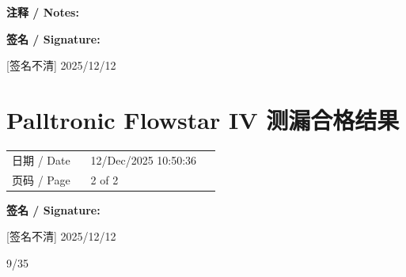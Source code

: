 \documentclass[UTF8,10pt,a4paper,fontset=fandol]{ctexart}
\newcommand{\fieldvalue}[1]{#1}
\newcommand{\handwritten}[1]{#1}
\begin{document}
\noindent\textbf{注释 / Notes:}

\vspace{1.5em}

\noindent\textbf{签名 / Signature:}

\fieldvalue{\handwritten{[签名不清]}} \hfill
\fieldvalue{\handwritten{2025/12/12}}

\vfill

\section{Palltronic Flowstar IV 测漏合格结果}

\begin{tabular}{@{}p{0.34\linewidth}p{0.56\linewidth}@{}}
日期 / Date &
\fieldvalue{12/Dec/2025 10:50:36}
\\[2pt]
页码 / Page &
\fieldvalue{2 of 2}
\end{tabular}

\vspace{1em}

\begin{center}
\end{center}

\noindent\textbf{签名 / Signature:}

\fieldvalue{\handwritten{[签名不清]}} \hfill
\fieldvalue{\handwritten{2025/12/12}}

\handwritten{9/35}

\newpage
\end{document}
